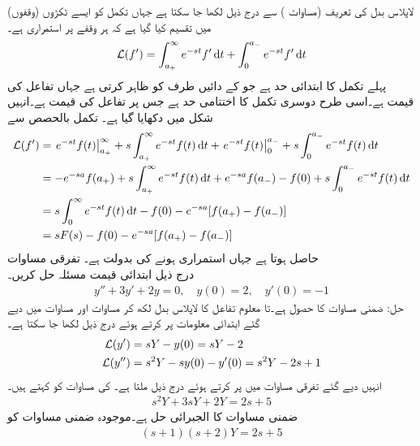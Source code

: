 لاپلاس بدل کی تعریف (مساوات ) سے درج ذیل لکھا جا سکتا ہے جہاں تکمل کو ایسے ٹکڑوں (وقفوں) میں تقسیم کیا گیا ہے کہ ہر وقفے پر  استمراری ہے۔
\begin{align*}
\Laplace(f')=\int_{a_+}^{\infty} e^{-st}f' \dif t+\int_{0}^{a_-}e^{-st}f' \dif t
\end{align*}  
پہلے تکمل کا ابتدائی حد  ہے جو  کے دائیں طرف کو ظاہر کرتی ہے جہاں تفاعل کی قیمت   ہے۔اسی طرح دوسری تکمل کا اختتامی حد  ہے جس پر تفاعل کی قیمت  ہے۔انہیں شکل میں دکھایا گیا ہے۔  تکمل بالحصص سے
\begin{align*}
\Laplace(f')&=\left. e^{-st} f(t)\right|_{a_+}^{\infty}+s\int_{a_+}^{\infty}e^{-st}f(t)\dif t+\left. e^{-st}f(t) \right|_{0}^{a_-}+s\int_{0}^{a_-}e^{-st} f(t)\dif t\\
&=-e^{-sa}f(a_+)+s\int_{a_+}^{\infty}e^{-st}f(t)\dif t+e^{-sa}f(a_-)-f(0)+s\int_{0}^{a_-}e^{-st} f(t)\dif t\\
&=s\int_{0}^{\infty}e^{-st}f(t)\dif t -f(0)-e^{-sa}[f(a_+)-f(a_-)]\\
&=sF(s) -f(0)-e^{-sa}[f(a_+)-f(a_-)]
\end{align*}
حاصل ہوتا ہے جہاں  استمراری ہونے کی بدولت   ہے۔
\quad تفرقی مساوات\\
درج ذیل ابتدائی قیمت مسئلہ حل  کریں۔
\begin{align*}
y''+3y'+2y=0, \quad y(0)=2, \quad y'(0)=-1
\end{align*} 
حل:  ضمنی مساوات کا حصول ہے۔تا معلوم تفاعل  کا لاپلاس بدل  لکھ کر مساوات  اور مساوات  میں دیے گئے ابتدائی معلومات پر کرتے ہوئے درج ذیل لکھا جا سکتا ہے۔
\begin{align*}
\mathcal{L}(y')&=sY-y(0)=sY-2\\
\mathcal{L}(y'')&=s^2Y-sy(0)-y'(0)=s^2Y-2s+1
\end{align*}
انہیں دیے گئے تفرقی مساوات میں پر کرتے ہوئے درج ذیل ملتا ہے۔ کی مساوات کو  کہتے ہیں۔
\begin{align*}
s^2Y+3sY+2Y=2s+5
\end{align*}
 ضمنی مساوات کا الجبرائی حل ہے۔موجودہ ضمنی مساوات کو
\begin{align*}
(s+1)(s+2)Y=2s+5
\end{align*}
